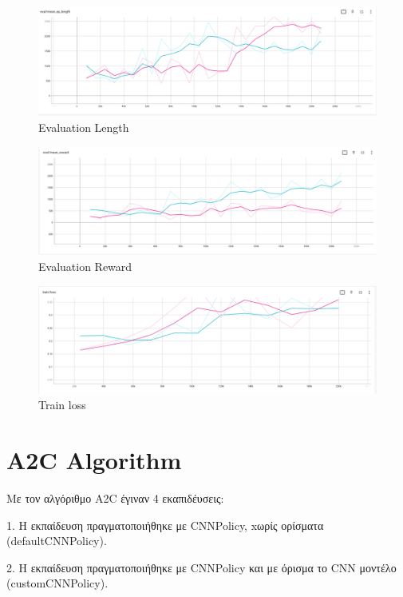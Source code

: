\begin{figure}[ht]
	\centering
	\includegraphics[width=1\linewidth]{Results/PPO_MLP/eval_length.png}
	\caption{ Evaluation Length}
	\label{f:g6}	
\end{figure}

\begin{figure}[ht]
	\centering
	\includegraphics[width=1\linewidth]{Results/PPO_MLP/eval_reward.png}
	\caption{ Evaluation Reward}
	\label{f:g7}	
\end{figure}


\begin{figure}[ht]
	\centering
	\includegraphics[width=1\linewidth]{Results/PPO_MLP/train_loss.png}
	\caption{Train loss}
	\label{f:g8}	
\end{figure}
\clearpage

\section{A2C Algorithm}
Με τον αλγόριθμο A2C έγιναν 4 εκαπιδέυσεις:

1. Η εκπαίδευση πραγματοποιήθηκε με CNNPolicy, xωρίς ορίσματα (defaultCNNPolicy).

2. Η εκπαίδευση πραγματοποιήθηκε με CNNPolicy και με όρισμα το CNN μοντέλο (customCNNPolicy).

